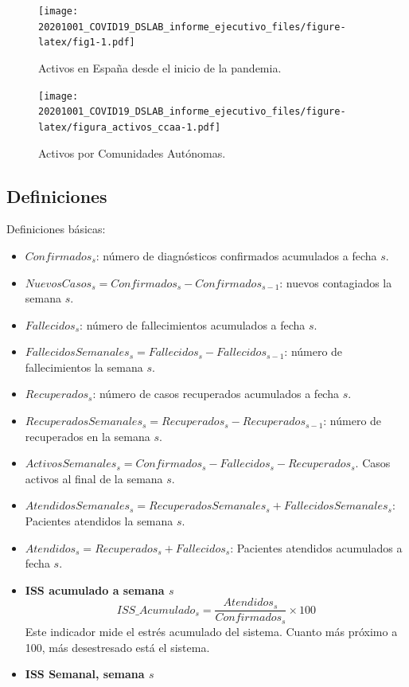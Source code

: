 \documentclass[
  11pt,
]{article}
\begin{document}
\vspace{0.2cm}

\begin{figure}
\centering
\texttt{[image: 20201001\_COVID19\_DSLAB\_informe\_ejecutivo\_files/figure-latex/fig1-1.pdf]}
\caption{\label{fig:fig17a_res} Activos en España desde el inicio de la
pandemia.}
\end{figure}

\begin{figure}
\centering
\texttt{[image: 20201001\_COVID19\_DSLAB\_informe\_ejecutivo\_files/figure-latex/figura\_activos\_ccaa-1.pdf]}
\caption{\label{fig:figura_activos_ccaa} Activos por Comunidades
Autónomas.}
\end{figure}

\clearpage

\hypertarget{definiciones}{%
\subsection{Definiciones}\label{definiciones}}

Definiciones básicas:

\begin{itemize}
\item
  \(Confirmados_s\): número de diagnósticos confirmados acumulados a
  fecha \(s\).
\item
  \(NuevosCasos_{s} = Confirmados_{s} - Confirmados_{s-1}\): nuevos
  contagiados la semana \(s\).
\item
  \(Fallecidos_s\): número de fallecimientos acumulados a fecha \(s\).
\item
  \(FallecidosSemanales_s = Fallecidos_{s} - Fallecidos_{s-1}\): número
  de fallecimientos la semana \(s\).
\item
  \(Recuperados_s\): número de casos recuperados acumulados a fecha
  \(s\).
\item
  \(RecuperadosSemanales_{s} = Recuperados_{s} - Recuperados_{s-1}\):
  número de recuperados en la semana \(s\).
\item
  \(ActivosSemanales_s = Confirmados_s - Fallecidos_s - Recuperados_s\).
  Casos activos al final de la semana \(s\).
\item
  \(AtendidosSemanales_{s} = RecuperadosSemanales_s + FallecidosSemanales_s\):
  Pacientes atendidos la semana \(s\).
\item
  \(Atendidos_{s} = Recuperados_s + Fallecidos_s\): Pacientes atendidos
  acumulados a fecha \(s\).
\item
  \textbf{ISS acumulado a semana \(s\)}
  \[ISS\_Acumulado_s = \frac{Atendidos_s}{Confirmados_s} \times 100\]
  Este indicador mide el estrés acumulado del sistema. Cuanto más
  próximo a 100, más desestresado está el sistema.
\item
  \textbf{ISS Semanal, semana \(s\)}
\end{itemize}
\end{document}
